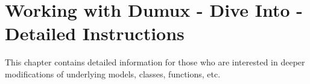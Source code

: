 \chapter[Working with Dumux - Dive Into \Dumux - Detailed Instructions]{Working with Dumux - Dive Into \Dumux - Detailed Instructions}

This chapter contains detailed information for those who are interested
in deeper modifications of underlying \Dumux models, classes, functions, etc.





